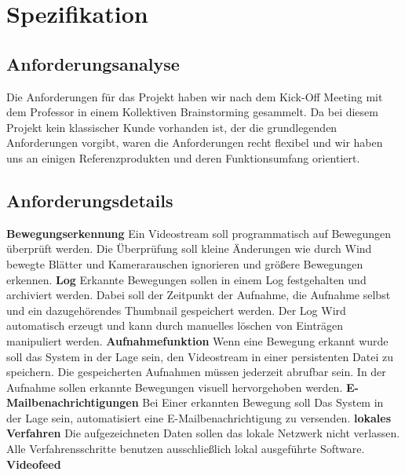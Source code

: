 \section{Spezifikation}
\subsection{Anforderungsanalyse}
Die Anforderungen für das Projekt haben wir nach dem Kick-Off Meeting mit dem Professor in einem Kollektiven Brainstorming gesammelt. Da bei diesem Projekt kein klassischer Kunde vorhanden ist, der die grundlegenden Anforderungen vorgibt, waren die Anforderungen recht flexibel und wir haben uns an einigen Referenzprodukten und deren Funktionsumfang orientiert.
\subsection{Anforderungsdetails}
\textbf{Bewegungserkennung}\newline
Ein Videostream soll programmatisch auf Bewegungen überprüft werden. Die Überprüfung soll kleine Änderungen wie durch Wind bewegte Blätter und Kamerarauschen ignorieren und größere Bewegungen erkennen.
\newline
\textbf{Log}\newline
Erkannte Bewegungen sollen in einem Log festgehalten und archiviert werden.
Dabei soll der Zeitpunkt der Aufnahme, die Aufnahme selbst und ein dazugehörendes Thumbnail gespeichert werden. Der Log Wird automatisch erzeugt und kann durch manuelles löschen von Einträgen manipuliert werden.
\newline
\textbf{Aufnahmefunktion}\newline
Wenn eine Bewegung erkannt wurde soll das System in der Lage sein, den Videostream in einer persistenten Datei zu speichern.
Die gespeicherten Aufnahmen müssen jederzeit abrufbar sein.
In der Aufnahme sollen erkannte Bewegungen visuell hervorgehoben werden.
\newline
\textbf{E-Mailbenachrichtigungen}\newline
Bei Einer erkannten Bewegung soll Das System in der Lage sein, automatisiert eine E-Mailbenachrichtigung zu versenden.
\newline
\textbf{lokales Verfahren}\newline
Die aufgezeichneten Daten sollen das lokale Netzwerk nicht verlassen.
Alle Verfahrensschritte benutzen ausschließlich lokal ausgeführte Software.
\newline
\textbf{Videofeed}\newline
